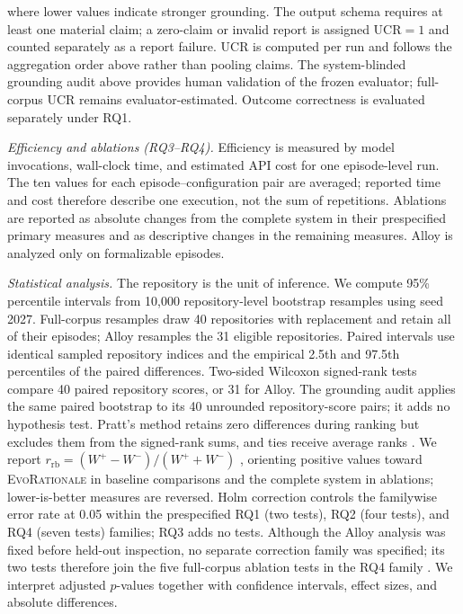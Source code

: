 \documentclass[10pt,conference]{IEEEtran}
\begin{document}
where lower values indicate stronger grounding. The output schema requires at least one material claim; a zero-claim or invalid report is assigned UCR$=1$ and counted separately as a report failure. UCR is computed per run and follows the aggregation order above rather than pooling claims. The system-blinded grounding audit above provides human validation of the frozen evaluator; full-corpus UCR remains evaluator-estimated. Outcome correctness is evaluated separately under RQ1.
\par\noindent\textit{Efficiency and ablations (RQ3--RQ4).} Efficiency is measured by model invocations, wall-clock time, and estimated API cost for one episode-level run. The ten values for each episode--configuration pair are averaged; reported time and cost therefore describe one execution, not the sum of repetitions. Ablations are reported as absolute changes from the complete system in their prespecified primary measures and as descriptive changes in the remaining measures. Alloy is analyzed only on formalizable episodes.
\par\noindent\textit{Statistical analysis.} The repository is the unit of inference. We compute 95\% percentile intervals from 10,000 repository-level bootstrap resamples using seed 2027. Full-corpus resamples draw 40 repositories with replacement and retain all of their episodes; Alloy resamples the 31 eligible repositories. Paired intervals use identical sampled repository indices and the empirical 2.5th and 97.5th percentiles of the paired differences. Two-sided Wilcoxon signed-rank tests compare 40 paired repository scores, or 31 for Alloy. The grounding audit applies the same paired bootstrap to its 40 unrounded repository-score pairs; it adds no hypothesis test. Pratt's method retains zero differences during ranking but excludes them from the signed-rank sums, and ties receive average ranks \cite{Pratt1959ZerosTies}. We report $r_{\mathrm{rb}}=(W^{+}-W^{-})/(W^{+}+W^{-})$ \cite{Kerby2014SimpleDifference}, orienting positive values toward \textsc{EvoRationale} in baseline comparisons and the complete system in ablations; lower-is-better measures are reversed. Holm correction controls the familywise error rate at 0.05 within the prespecified RQ1 (two tests), RQ2 (four tests), and RQ4 (seven tests) families; RQ3 adds no tests. Although the Alloy analysis was fixed before held-out inspection, no separate correction family was specified; its two tests therefore join the five full-corpus ablation tests in the RQ4 family \cite{Holm1979Procedure}. We interpret adjusted $p$-values together with confidence intervals, effect sizes, and absolute differences.
\end{document}
